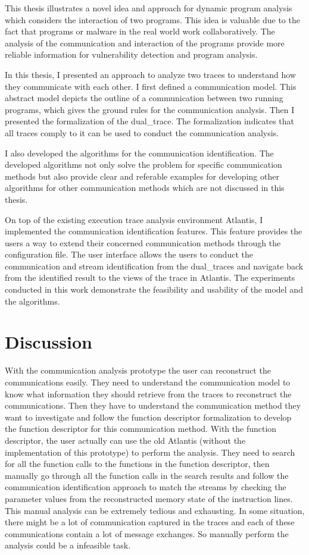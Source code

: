 \label{concl}
This thesis illustrates a novel idea and approach for dynamic program analysis which considers the interaction of two programs. This idea is valuable due to the fact that programs or malware in the real world work collaboratively. The analysis of the communication and interaction of the programs provide more reliable information for vulnerability detection and program analysis.

In this thesis, I presented an approach to analyze two traces to understand how they communicate with each other. I first defined a communication model. This abstract model depicts the outline of a communication between two running programs, which gives the ground rules for the communication analysis. Then I presented the  formalization of the dual\_trace. The formalization indicates that all traces comply to it can be used to conduct the communication analysis.

I also developed the algorithms for the communication identification. The developed algorithms not only solve the problem for specific communication methods but also provide clear and referable examples for developing other algorithms for other communication methods which are not discussed in this thesis.

On top of the existing execution trace analysis environment Atlantis, I implemented the communication identification features. This feature provides the users a way to extend their concerned communication methods through the configuration file. The user interface allows the users to conduct the communication and stream identification from the dual\_traces and navigate back from the identified result to the views of the trace in Atlantis. The experiments conducted in this work demonstrate the feasibility and usability of the model and the algorithms. 

\section{Discussion}
With the communication analysis prototype the user can reconstruct the communications easily. They need to understand the communication model to know what information they should retrieve from the traces to reconstruct the communications. Then they have to understand the communication method they want to investigate and follow the function descriptor formalization to develop the function descriptor for this communication method. With the function descriptor, the user actually can use the old Atlantis (without the implementation of this prototype) to perform the analysis. They need to search for all the function calls to the functions in the function descriptor, then manually go through all the function calls in the search results and follow the communication identification approach to match the streams by checking the parameter values from the reconstructed memory state of the instruction lines. This manual analysis can be extremely tedious and exhausting. In some situation, there might be a lot of communication captured in the traces and each of these communications contain a lot of message exchanges. So manually perform the analysis could be a infeasible task.

